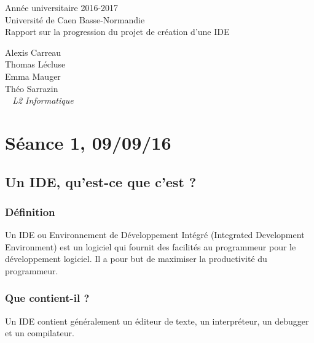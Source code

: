 \documentclass[a4paper,12pt]{article}
\begin{document}
\begin{titlepage}
	\begin{center}
		\Large{Année universitaire 2016-2017}\\
		\Large{Université de Caen Basse-Normandie}\\[1cm]
		
		\huge{Rapport sur la progression du projet de création d'une IDE}\\
		\vspace{3cm}
		
		Alexis Carreau\\
		Thomas Lécluse\\
		Emma Mauger\\
		Théo Sarrazin\\
		
	\normalsize{\textit{ ~ L2 Informatique}}\\
		\medskip
		\vspace{2cm}
		
	\end{center}
\end{titlepage}

\tableofcontents
\newpage

\section{Séance 1, 09/09/16}

	\subsection{Un IDE, qu'est-ce que c'est ?}

		\subsubsection{Définition}

			Un  IDE   ou  Environnement   de  Développement   Intégré  (Integrated
			Development Environment) est un logiciel  qui fournit des facilités au
			programmeur pour le développement logiciel. Il a pour but de maximiser
			la productivité du programmeur.

		\subsubsection{Que contient-il ?}

			Un IDE contient généralement un  éditeur de texte, un interpréteur, un
			debugger et un compilateur.
\end{document}
